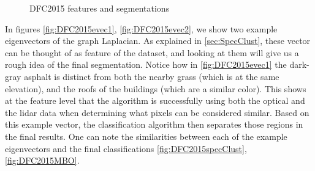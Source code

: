 \documentclass[journal]{IEEEtran}
\begin{document}
\begin{figure}[!t]
{    \label{fig:DFC2015MBO}} %
  \hfil%
  \hfil %
  \caption{DFC2015 features and segmentations}
  \label{fig:DFC2015fig2}
\end{figure}


In figures \ref{fig:DFC2015evec1}, \ref{fig:DFC2015evec2}, we show two example
eigenvectors of the graph Laplacian. As explained in \ref{sec:SpecClust}, these
vector can be thought of as feature of the dataset, and looking at them will
give us a rough idea of the final segmentation. Notice how in \ref{fig:DFC2015evec1}
the dark-gray asphalt is distinct from both the nearby grass (which is at the
same elevation), and the roofs of the buildings (which are a similar
color). This shows at the feature level that the algorithm is successfully using
both the optical and the lidar data when determining what pixels can be
considered similar. Based on this example vector, the classification algorithm
then separates those regions in the final results. One can note the similarities
between each of the example eigenvectors and the final classifications
\ref{fig:DFC2015specClust}, \ref{fig:DFC2015MBO}.
\end{document}
